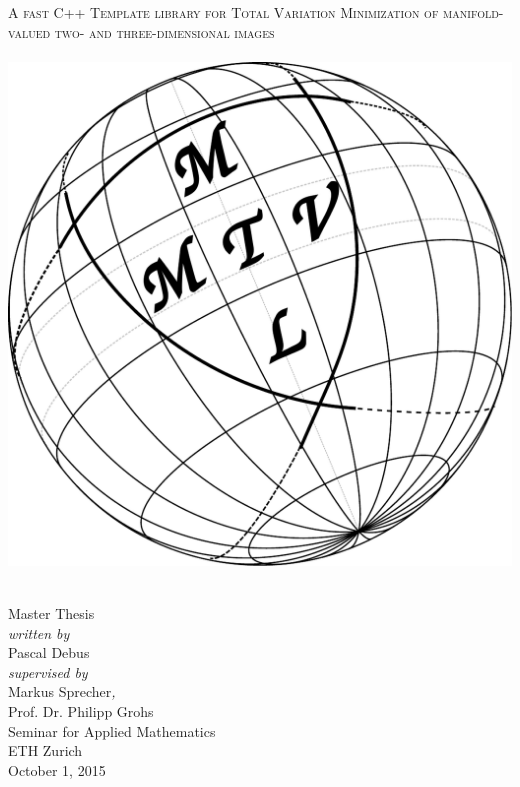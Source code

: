 \begin{titlepage}
\begin{center}
  \hfill
  \vspace{2.0cm}

  { \huge\textsc{\LARGE A fast C++ Template library for Total Variation Minimization of manifold-valued 
  two- and three-dimensional images\\[10pt]
  }}
  	~\\[20pt]
	
   \includegraphics[width=0.5\linewidth]{./figures/title/mtvmtl.pdf}
	
	~\\[20pt]

  {\huge{Master Thesis}}\\[2.5cm]

  {\emph{written by}}\\
  {\large Pascal Debus}
  \\[0.6cm]
  {\emph{supervised by}}\\
  Markus Sprecher{\emph{,}}\\
  Prof. Dr. Philipp Grohs\\

  Seminar for Applied Mathematics\\
  ETH Zurich
  \\[0.5cm]
  {October 1, 2015}
\end{center}
\end{titlepage}


